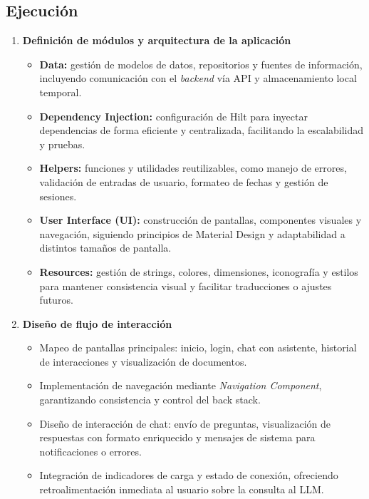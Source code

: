 \subsection{Ejecución}
\begin{enumerate}
      \item \textbf{Definición de módulos y arquitectura de la aplicación}
            \begin{itemize}
                  \item \textbf{Data:} gestión de modelos de datos, repositorios y fuentes de información, incluyendo comunicación con el \textit{backend} vía API y almacenamiento local temporal.
                  \item \textbf{Dependency Injection:} configuración de Hilt para inyectar dependencias de forma eficiente y centralizada, facilitando la escalabilidad y pruebas.
                  \item \textbf{Helpers:} funciones y utilidades reutilizables, como manejo de errores, validación de entradas de usuario, formateo de fechas y gestión de sesiones.
                  \item \textbf{User Interface (UI):} construcción de pantallas, componentes visuales y navegación, siguiendo principios de Material Design y adaptabilidad a distintos tamaños de pantalla.
                  \item \textbf{Resources:} gestión de strings, colores, dimensiones, iconografía y estilos para mantener consistencia visual y facilitar traducciones o ajustes futuros.
            \end{itemize}

      \item \textbf{Diseño de flujo de interacción}
            \begin{itemize}
                  \item Mapeo de pantallas principales: inicio, login, chat con asistente, historial de
                        interacciones y visualización de documentos.
                  \item Implementación de navegación mediante \textit{Navigation Component},
                        garantizando consistencia y control del back stack.
                  \item Diseño de interacción de chat: envío de preguntas, visualización de respuestas
                        con formato enriquecido y mensajes de sistema para notificaciones o errores.
                  \item Integración de indicadores de carga y estado de conexión, ofreciendo
                        retroalimentación inmediata al usuario sobre la consulta al LLM.
            \end{itemize}


\end{enumerate}
